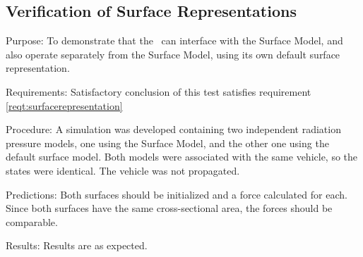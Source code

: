 \subsection{Verification of Surface Representations}

 \label{test:surfacerepresentation}
\begin{description}
\item{Purpose:}\newline
To demonstrate that the \RadiationPressureDesc\ can interface with the Surface Model, and also operate separately from the Surface Model, using its own default surface representation.
\item{Requirements:}\newline
Satisfactory conclusion of this test satisfies requirement \ref{reqt:surfacerepresentation}
\item{Procedure:}\newline
A simulation was developed containing two independent radiation pressure models, one using the Surface Model, and the other one using the default surface model.  Both models were associated with the same vehicle, so the states were identical.  The vehicle was not propagated.
\item{Predictions:}\newline
Both surfaces should be initialized and a force calculated for each.  Since both surfaces have the same cross-sectional area, the forces should be comparable.
\item{Results:}\newline
Results are as expected.
\end{description}



